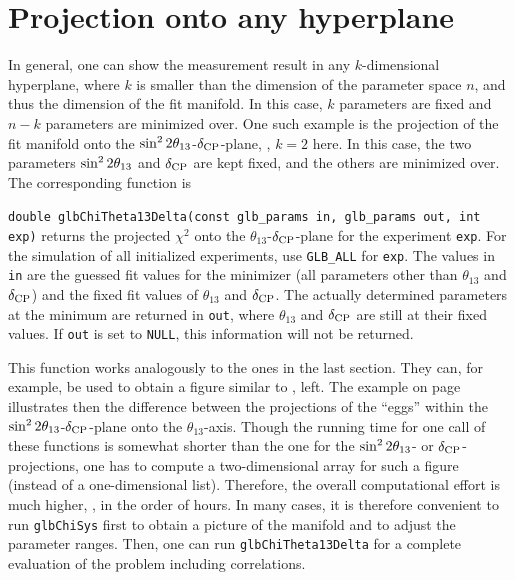 \section[Projection onto any hyperplane]{Projection onto any hyperplane}

In general, one can show the measurement result in any $k$-dimensional hyperplane, where $k$ is smaller than the dimension of the parameter space $n$, and thus the dimension of the fit manifold. In this case, $k$ parameters are fixed and $n-k$ parameters are minimized over. One such example is the projection of the fit manifold onto the $\sin^2 2 \theta_{13}$-$\delta_{\mathrm{CP}}$-plane, \ie, $k=2$ here. In this case, the two
parameters $\sin^2 2 \theta_{13}$ and $\delta_{\mathrm{CP}}$ are kept fixed, and the others are
minimized over. 
The corresponding function is 
\begin{function}
{\tt double glbChiTheta13Delta(const glb\_params in, glb\_params out, int exp)} returns the projected $\chi^2$ onto the $\theta_{13}$-$\delta_{\mathrm{CP}}$-plane for the  experiment {\tt exp}. For the simulation of all initialized experiments,
use {\tt GLB\_ALL} for {\tt exp}. The values in {\tt in} are the guessed fit values for the minimizer (all parameters other than $\theta_{13}$ and $\delta_{\mathrm{CP}}$) and the fixed fit values of $\theta_{13}$ and $\delta_{\mathrm{CP}}$. The actually determined parameters at the minimum are returned in {\tt out}, where $\theta_{13}$ and $\delta_{\mathrm{CP}}$ are still at their fixed values. If {\tt out} is set to {\tt NULL}, this information will not be returned.
\end{function}
This function works analogously to the ones in the last section. They can, for example, be used to obtain a figure similar to , left.
The example on page~\pageref{ex:corrproj} illustrates then the difference
between the projections of the ``eggs'' within the 
$\sin^2 2 \theta_{13}$-$\delta_{\mathrm{CP}}$-plane onto the $\theta_{13}$-axis. 
Though the running time for one call of these functions is somewhat 
shorter than the one for the $\sin^2 2 \theta_{13}$- or $\delta_{\mathrm{CP}}$-projections, one 
has to compute a two-dimensional array for such a figure (instead of a 
one-dimensional list). Therefore, the overall computational effort is 
much higher, \ie, in the order of hours. In many cases, it is therefore
convenient to run {\tt glbChiSys} first to obtain a picture of
the manifold and to adjust the parameter ranges. Then, one can run
{\tt glbChiTheta13Delta} for a complete evaluation of the problem
including correlations.

